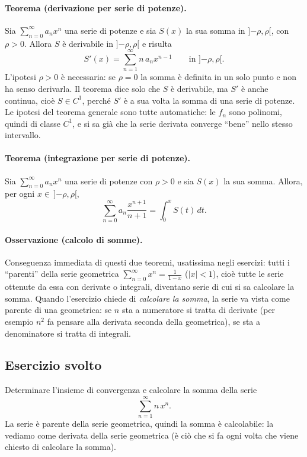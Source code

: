 \paragraph{Teorema (derivazione per serie di potenze).}
Sia $\sum_{n=0}^{\infty} a_n x^n$ una serie di potenze e sia $S(x)$ la sua somma in $]{-\rho},\rho[$, con
$\rho>0$. Allora $S$ è derivabile in $]{-\rho},\rho[$ e risulta
\[
  S'(x) = \sum_{n=1}^{\infty} n\, a_n x^{n-1} \qquad \text{in } ]{-\rho},\rho[ .
\]
L'ipotesi $\rho>0$ è necessaria: se $\rho=0$ la somma è definita in un solo punto e non ha senso derivarla.
Il teorema dice solo che $S$ è derivabile, ma $S'$ è anche continua, cioè $S\in C^1$, perché $S'$ è a sua volta
la somma di una serie di potenze. Le ipotesi del teorema generale sono tutte automatiche: le $f_n$ sono
polinomi, quindi di classe $C^1$, e si sa già che la serie derivata converge ``bene'' nello stesso intervallo.

\paragraph{Teorema (integrazione per serie di potenze).}
Sia $\sum_{n=0}^{\infty} a_n x^n$ una serie di potenze con $\rho>0$ e sia $S(x)$ la sua somma. Allora, per ogni
$x\in\,]{-\rho},\rho[$,
\[
  \sum_{n=0}^{\infty} a_n \frac{x^{n+1}}{n+1} = \int_0^x S(t)\,dt .
\]

\paragraph{Osservazione (calcolo di somme).}
Conseguenza immediata di questi due teoremi, usatissima negli esercizi: tutti i ``parenti'' della serie
geometrica $\sum_{n=0}^{\infty} x^n = \frac{1}{1-x}$ ($|x|<1$), cioè tutte le serie ottenute da essa con
derivate o integrali, diventano serie di cui si sa calcolare la somma. Quando l'esercizio chiede di
\emph{calcolare la somma}, la serie va vista come parente di una geometrica: se $n$ sta a numeratore si tratta di
derivate (per esempio $n^2$ fa pensare alla derivata seconda della geometrica), se sta a denominatore si tratta
di integrali.

\subsection{Esercizio svolto}

Determinare l'insieme di convergenza e calcolare la somma della serie
\[
  \sum_{n=1}^{\infty} n\, x^n .
\]
La serie è parente della serie geometrica, quindi la somma è calcolabile: la vediamo come derivata della serie
geometrica (è ciò che si fa ogni volta che viene chiesto di calcolare la somma).

